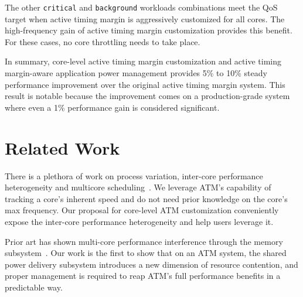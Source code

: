 The other \texttt{critical} and \texttt{background} workloads combinations meet the QoS target when active timing margin is aggressively customized for all cores. The high-frequency gain of active timing margin customization provides this benefit. For these cases, no core throttling needs to take place.

In summary, core-level active timing margin customization and active timing margin-aware application power management provides 5\% to 10\% steady performance improvement over the original active timing margin system. This result is notable because the improvement comes on a production-grade system where even a 1\% performance gain is considered significant.

\section{Related Work}
\label{sec:process:related}

There is a plethora of work on process variation, inter-core performance heterogeneity and multicore scheduling~\cite{liang2007process,sarangi2008varius,teodorescu2008variation,rangan2009thread,dighe2010within,rangan2011achieving}. We leverage ATM's capability of tracking a core's inherent speed and do not need prior knowledge on the core's max frequency. Our proposal for core-level ATM customization conveniently expose the inter-core performance heterogeneity and help users leverage it.

Prior art has shown multi-core performance interference through the memory subsystem~\cite{mars11micro,tang11isca,delimitrou2014quasar,lo2015heracles,verma2015large,llull2017cooper}. Our work is the first to show that on an ATM system, the shared power delivery subsystem introduces a new dimension of resource contention, and proper management is required to reap ATM's full performance benefits in a predictable way.

